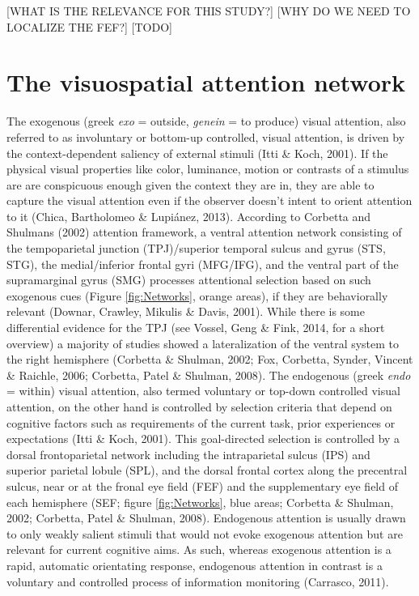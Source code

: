 \documentclass[a4paper, 11pt]{scrreprt}
\begin{document}
[WHAT IS THE RELEVANCE FOR THIS STUDY?]
[WHY DO WE NEED TO LOCALIZE THE FEF?]
[TODO]  \\

\section{The visuospatial attention network}
The exogenous (greek \textit{exo} = outside, \textit{genein} = to produce) visual attention, also referred to as involuntary or bottom-up controlled, visual attention, is driven by the context-dependent saliency of external stimuli (Itti \& Koch, 2001). If the physical visual properties like color, luminance, motion or contrasts of a stimulus are are conspicuous enough given the context they are in, they are able to capture the visual attention even if the observer doesn’t intent to orient attention to it (Chica, Bartholomeo \& Lupiánez, 2013). According to Corbetta and Shulmans (2002) attention framework, a ventral attention network consisting of the tempoparietal junction (TPJ)/superior temporal sulcus and gyrus (STS, STG), the medial/inferior frontal gyri (MFG/IFG), and the ventral part of the supramarginal gyrus (SMG) processes attentional selection based on such exogenous cues (Figure \ref{fig:Networks}, orange areas), if they are behaviorally relevant (Downar, Crawley, Mikulis \& Davis, 2001). While there is some differential evidence for the TPJ (see Vossel, Geng \& Fink, 2014, for a short overview) a majority of studies showed a lateralization of the ventral system to the right hemisphere (Corbetta \& Shulman, 2002; Fox, Corbetta, Synder, Vincent \& Raichle, 2006; Corbetta, Patel \& Shulman, 2008). \newline 
The endogenous (greek \textit{endo} = within) visual attention, also termed voluntary or top-down controlled visual attention, on the other hand is controlled by selection criteria that depend on cognitive factors such as requirements of the current task, prior experiences or expectations (Itti \& Koch, 2001). This goal-directed selection is controlled by a dorsal frontoparietal network including the intraparietal sulcus (IPS) and superior parietal lobule (SPL), and the dorsal frontal cortex along the precentral sulcus, near or at the fronal eye field (FEF) and the supplementary eye field of each hemisphere (SEF; figure \ref{fig:Networks}, blue areas; Corbetta \& Shulman, 2002; Corbetta, Patel \& Shulman, 2008). Endogenous attention is usually drawn to only weakly salient stimuli that would not evoke exogenous attention but are relevant for current cognitive aims. As such, whereas exogenous attention is a rapid, automatic orientating response, endogenous attention in contrast is a voluntary and controlled process of information monitoring (Carrasco, 2011).
\end{document}
